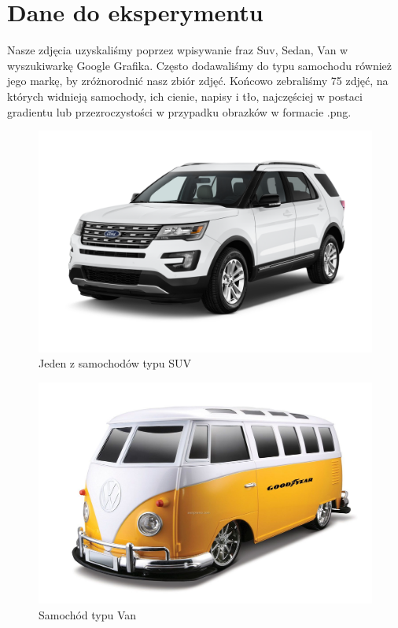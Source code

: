 \documentclass{article}
\begin{document}
\section{Dane do eksperymentu}
Nasze zdjęcia uzyskaliśmy poprzez wpisywanie fraz Suv, Sedan, Van w wyszukiwarkę Google Grafika. Często dodawaliśmy do typu samochodu również jego markę, by zróżnorodnić nasz zbiór zdjęć. Końcowo zebraliśmy 75 zdjęć, na których widnieją samochody, ich cienie, napisy i tło, najczęściej w postaci gradientu lub przezroczystości w przypadku obrazków w formacie .png.
\begin{figure}[H]
\begin{center}
\includegraphics[width=1\textwidth]{../imgs_easy/suv_07.png}
\end{center}
\caption{Jeden z samochodów typu SUV}
\label{fig: wykres1}
\end{figure}

\begin{figure}[H]
\begin{center}
\includegraphics[width=1\textwidth]{../imgs_easy/van_19.jpg}
\end{center}
\caption{Samochód typu Van}
\label{fig: wykres2}
\end{figure}
\end{document}

